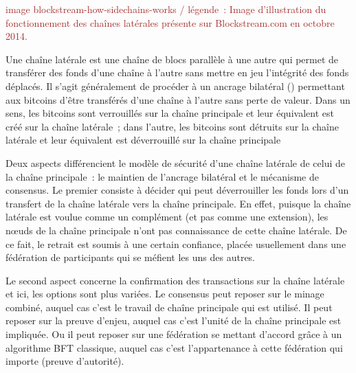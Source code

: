 \textcolor{brown}{image blockstream-how-sidechains-works / légende~: Image d'illustration du fonctionnement des chaînes latérales présente sur Blockstream.com en octobre 2014.}

Une chaîne latérale est une chaîne de blocs parallèle à une autre qui permet de transférer des fonds d'une chaîne à l'autre sans mettre en jeu l'intégrité des fonds déplacés. Il s'agit généralement de procéder à un ancrage bilatéral () permettant aux bitcoins d'être transférés d'une chaîne à l'autre sans perte de valeur. Dans un sens, les bitcoins sont verrouillés sur la chaîne principale et leur équivalent est créé sur la chaîne latérale~; dans l'autre, les bitcoins sont détruits sur la chaîne latérale et leur équivalent est déverrouillé sur la chaîne principale

Deux aspects différencient le modèle de sécurité d'une chaîne latérale de celui de la chaîne principale~: le maintien de l'ancrage bilatéral et le mécanisme de consensus. Le premier consiste à décider qui peut déverrouiller les fonds lors d'un transfert de la chaîne latérale vers la chaîne principale. En effet, puisque la chaîne latérale est voulue comme un complément (et pas comme une extension), les nœuds de la chaîne principale n'ont pas connaissance de cette chaîne latérale. De ce fait, le retrait est soumis à une certain confiance, placée usuellement dans une fédération de participants qui se méfient les uns des autres.

Le second aspect concerne la confirmation des transactions sur la chaîne latérale et ici, les options sont plus variées. Le consensus peut reposer sur le minage combiné, auquel cas c'est le travail de chaîne principale qui est utilisé. Il peut reposer sur la preuve d'enjeu, auquel cas c'est l'unité de la chaîne principale est impliquée. Ou il peut reposer sur une fédération se mettant d'accord grâce à un algorithme BFT classique, auquel cas c'est l'appartenance à cette fédération qui importe (preuve d'autorité).


